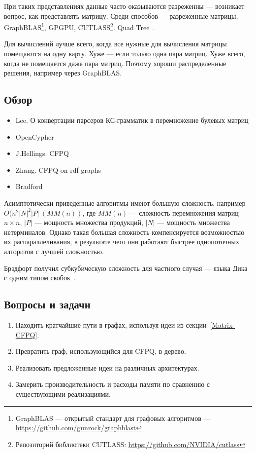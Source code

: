 При таких представлениях данные часто оказываются разреженны --- возникает вопрос, как представлять матрицу. Среди способов --- разреженные матрицы, GraphBLAS\footnote{GraphBLAS --- открытый стандарт для графовых алгоритмов --- \url{https://github.com/gunrock/graphblast} }, GPGPU, CUTLASS\footnote{Репозиторий библиотеки CUTLASS: \url{https://github.com/NVIDIA/cutlass}}.
Quad Tree~\cite{quadtree}.

Для вычислений лучше всего, когда все нужные для вычисления матрицы помещаются на одну карту. Хуже --- если только одна пара матриц. Хуже всего, когда не помещается даже пара матриц. Поэтому хороши распределенные решения, например через GraphBLAS.

\subsection{Обзор}
\begin{itemize}
	\item Lee. О конвертации парсеров КС-грамматик в перемножение булевых матриц~\cite{Lee:2002:FCG:505241.505242}
	\item OpenCypher~\cite{Kuijpers:2019:ESC:3335783.3335791}
	\item J.Hellings. CFPQ~\cite{hellingsRelational,hellings2015querying,Hellings2015PathRF}
	\item Zhang. CFPQ on rdf graphs~\cite{10.1007/978-3-319-46523-4_38}
	\item Bradford~\cite{bradford2007quickest,ward2008distributed,bradford2016fast,Bradford:2008:LCG:1373936.1373946}
\end{itemize}

Асимптотически приведенные алгоритмы имеют большую сложность, например \\ $O(n^2 |N|^2|P|~ (MM(n))$, где $MM(n)$ --- сложность перемножения матриц $n \times n$, $|P|$ --- мощность множества продукций, $|N|$ --- мощность множества нетерминалов. Однако такая большая сложность компенсируется возможностью их распараллеливания, в результате чего они работают быстрее однопоточных алгоритов с лучшей сложностью.

Брэдфорт получил субкубическую сложность для частного случая --- языка Дика с одним типом скобок~\cite{8249039}.

\subsection{Вопросы и задачи}
\begin{enumerate}
	\item Находить кратчайшие пути в графах, используя идеи из секции~\ref{Matrix-CFPQ}.
	\item Превратить граф, использующийся для CFPQ, в дерево.
  	\item Реализовать предложенные идеи на различных архитектурах.
  	\item Замерить производительность и расходы памяти по сравнению с существующими реализациями.
\end{enumerate}
